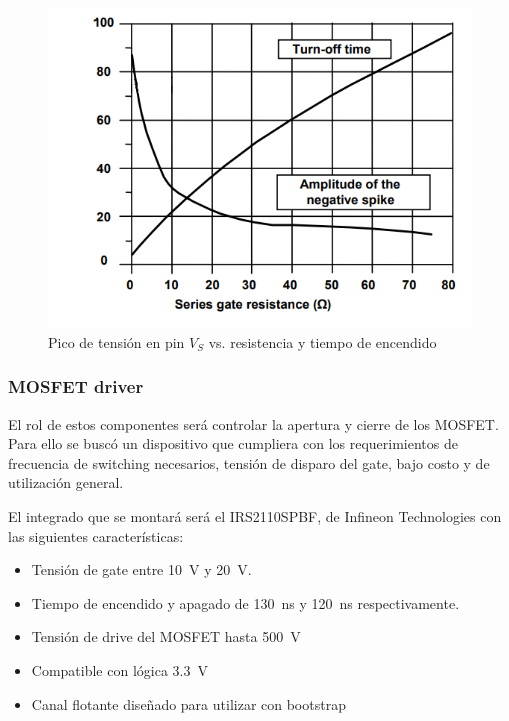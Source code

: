 \documentclass[../et.tex]{subfiles}
\begin{document}
  \begin{figure}[!htbp]
    \centering
    \includegraphics[scale=0.5]{../images/mosfet-driver-vs.png}
    \caption{Pico de tensión en pin $V_S$ vs. resistencia y tiempo de encendido}
    \label{fig:mosfet-driver-vs}
  \end{figure}

  \subsubsection{MOSFET driver}
  El rol de estos componentes será controlar la apertura y cierre de los MOSFET. Para ello se buscó un dispositivo que cumpliera con los requerimientos de frecuencia de switching necesarios, tensión de disparo del gate, bajo costo y de utilización general.

  El integrado que se montará será el IRS2110SPBF, de Infineon Technologies con las siguientes características:

    \begin{itemize}
      \item Tensión de gate entre \SI{10}{V} y \SI{20}{V}.
      \item Tiempo de encendido y apagado de \SI{130}{ns} y \SI{120}{ns} respectivamente.
      \item Tensión de drive del MOSFET hasta \SI{500}{V}
      \item Compatible con lógica \SI{3.3}{V}
      \item Canal flotante diseñado para utilizar con bootstrap
    \end{itemize}
\end{document}

